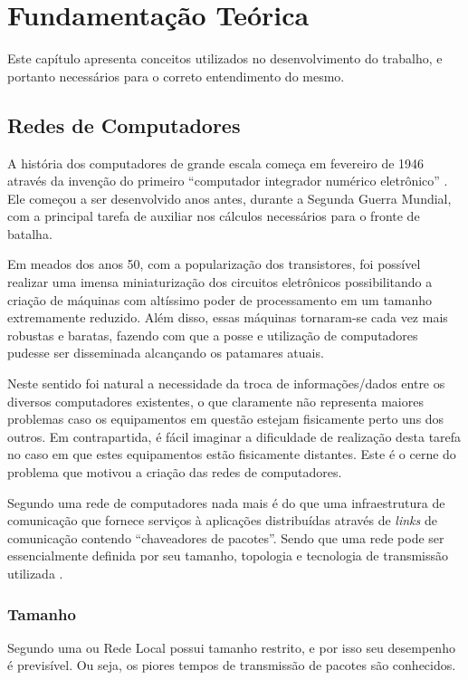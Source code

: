 \chapter{Fundamentação Teórica}
Este capítulo apresenta conceitos utilizados no desenvolvimento do trabalho, e portanto necessários para o correto entendimento do mesmo.

\section{Redes de Computadores}
A história dos computadores de grande escala começa em fevereiro de 1946 através da invenção do primeiro ``computador integrador numérico eletrônico''  \cite{Book-Jean2013}. Ele começou a ser desenvolvido anos antes, durante a Segunda Guerra Mundial, com a principal tarefa de auxiliar nos cálculos necessários para o fronte de batalha.

Em meados dos anos 50, com a popularização dos transistores, foi possível realizar uma imensa miniaturização dos circuitos eletrônicos possibilitando a criação de máquinas com altíssimo poder de processamento em um tamanho extremamente reduzido. Além disso, essas máquinas tornaram-se cada vez mais robustas e baratas, fazendo com que a posse e utilização de computadores pudesse ser disseminada alcançando os patamares atuais.

Neste sentido foi natural a necessidade da troca de informações/dados entre os diversos computadores existentes, o que claramente não representa maiores problemas caso os equipamentos em questão estejam fisicamente perto uns dos outros. Em contrapartida, é fácil imaginar a dificuldade de realização desta tarefa no caso em que estes equipamentos estão fisicamente distantes. Este é o cerne do problema que motivou a criação das redes de computadores.

Segundo \cite{Book-Kurose2013} uma rede de computadores nada mais é do que uma infraestrutura de comunicação que fornece serviços à aplicações distribuídas através de \emph{links} de comunicação contendo ``chaveadores de pacotes''. Sendo que uma rede pode ser essencialmente definida por seu tamanho, topologia e tecnologia de transmissão utilizada \cite{Book-Tanenbaum2003}. 

\subsection{Tamanho}
Segundo \cite{Book-Tanenbaum2003} uma  ou Rede Local possui tamanho restrito, e por isso seu desempenho é previsível. Ou seja, os piores tempos de transmissão de pacotes são conhecidos. 

